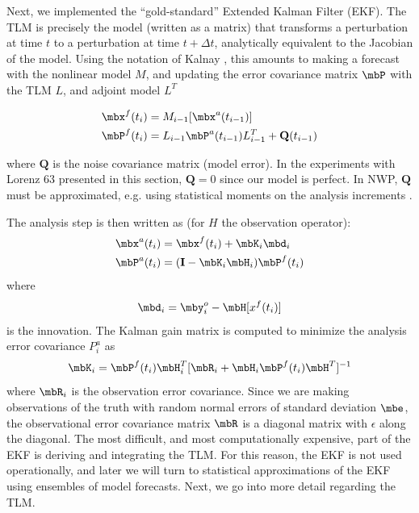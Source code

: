 Next, we implemented the ``gold-standard'' Extended Kalman Filter (EKF).
The TLM is precisely the model (written as a matrix) that transforms a perturbation at time $t$ to a perturbation at time $t+\Delta t$, analytically equivalent to the Jacobian of the model.
Using the notation of Kalnay \cite{kalnay2003}, this amounts to making a forecast with the nonlinear model $M$, and updating the error covariance matrix $\mbP$ with the TLM $L$, and adjoint model $L^T$

\begin{align*} \mbx^f (t_i) &= M _{i-1} [\mbx ^a (t_{i-1} ) ]\\
\mbP^f (t_i ) &= L_{i-1} \mbP^a (t_{i-1} ) L^T _{i-1} + \mathbf{Q} (t_{i-1} ) \end{align*}

where $\mathbf{Q}$ is the noise covariance matrix (model error).
In the experiments with Lorenz 63 presented in this section, $\mathbf{Q} = 0$ since our model is perfect.
In NWP, $\mathbf{Q}$ must be approximated, e.g. using statistical moments on the analysis increments \cite{danforth2007estimating,li2009accounting}.

The analysis step is then written as (for $H$ the observation operator):
\begin{align} \mbx^a (t_i ) &= \mbx^f (t_i) + \mbK_i \mbd_i\\
\mbP^a (t_i) &= (\mathbf{I} - \mbK_i \mbH_i )\mbP^f (t_i) \end{align}
where
\[ \mbd_i = \mby_i^o - \mbH[x^f (t_i) ] \]
is the innovation. The Kalman gain matrix is computed to minimize the analysis error covariance $P^a _i$ as
\[ \mbK_i = \mbP^f (t_i) \mbH_i ^T [ \mbR_i + \mbH_i \mbP^f (t_i) \mbH^T ] ^{-1} \]
where $\mbR_i$ is the observation error covariance.
Since we are making observations of the truth with random normal errors of standard deviation $\mbe$, the observational error covariance matrix $\mbR$ is a diagonal matrix with $\epsilon$ along the diagonal.
The most difficult, and most computationally expensive, part of the EKF is deriving and integrating the TLM.
For this reason, the EKF is not used operationally, and later we will turn to statistical approximations of the EKF using ensembles of model forecasts.
Next, we go into more detail regarding the TLM.

